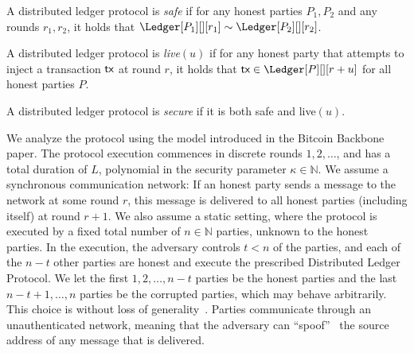 \begin{definition}[Safety]
  A distributed ledger protocol is \emph{safe} if
  for any honest parties $P_1, P_2$ and any rounds $r_1, r_2$, it holds that
  $\Ledger[P_1][][r_1] \sim \Ledger[P_2][][r_2]$.
\end{definition}

\begin{definition}[Liveness]
  A distributed ledger protocol is \emph{live}$(u)$ if
  for any honest party that attempts to inject a transaction $\textsf{tx}$
  at round $r$, it holds that $\tx \in \Ledger[P][][r+u]$
  for all honest parties $P$.
\end{definition}

\begin{definition}[Security]
  A distributed ledger protocol is \emph{secure} if it is
  both safe and live$(u)$.
\end{definition}

\noindent
{}
We analyze the protocol using the model introduced in the Bitcoin Backbone~\cite{backbone} paper.
The protocol execution commences in discrete rounds $1, 2, \ldots$, and has a total duration of
$L$, polynomial in the security parameter $\kappa \in \mathbb{N}$.
We assume a synchronous communication network: If an honest party sends a message
to the network at some round $r$, this message is delivered to all honest parties
(including itself) at round $r + 1$.
We also assume a static setting, where the protocol is executed by
a fixed total number of $n \in \mathbb{N}$ parties, unknown to the honest parties.
In the execution, the adversary controls $t < n$ of the parties,
and each of the $n - t$ other parties are honest and execute the prescribed Distributed Ledger
Protocol. We let the first $1, 2, \ldots, n - t$ parties be the honest parties
and the last $n - t + 1, \ldots, n$ parties be the corrupted parties, which may behave arbitrarily.
This choice is without loss of generality~\cite[Proposition 18]{backbone}.
Parties communicate through an unauthenticated network,
meaning that the adversary can ``spoof''~\cite{douceur2002sybil}
the source address of any message that is delivered.

